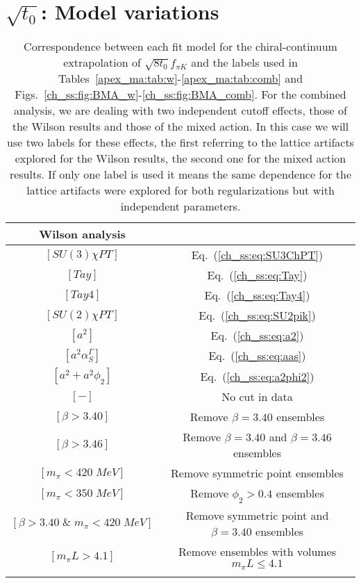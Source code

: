 
\chapter{$\sqrt{t_0}$: Model variations}
\label{apex_model_av_t0}


\begin{longtable}{c | c}
\label{apex_ma:tab:labels}
Wilson analysis \\
\toprule
$[SU(3)\chi PT]$ & Eq.~(\ref{ch_ss:eq:SU3ChPT}) \\
$[Tay]$ & Eq.~(\ref{ch_ss:eq:Tay}) \\
$[Tay4]$ & Eq.~(\ref{ch_ss:eq:Tay4}) \\
$[SU(2)\chi PT]$ & Eq.~(\ref{ch_ss:eq:SU2pik}) \\
\midrule
$[a^2]$ & Eq.~(\ref{ch_ss:eq:a2}) \\
$[a^2\alpha_S^{\Gamma}]$ & Eq.~(\ref{ch_ss:eq:aas}) \\
$[a^2+a^2\phi_2]$ & Eq.~(\ref{ch_ss:eq:a2phi2}) \\
\midrule
$[-]$ & No cut in data \\
$[\beta>3.40]$ & Remove $\beta=3.40$ ensembles \\
$[\beta>3.46]$ & Remove $\beta=3.40$ and $\beta=3.46$ ensembles \\
$[m_{\pi}<420\;MeV]$ & Remove symmetric point ensembles \\
$[m_{\pi}<350\;MeV]$ & Remove $\phi_2>0.4$ ensembles \\
$[\beta>3.40\;\&\;m_{\pi}<420\;MeV]$ & Remove symmetric point and $\beta=3.40$ ensembles \\
$[m_{\pi}L>4.1]$ & Remove ensembles with volumes $m_{\pi}L\leq4.1$ \\
\bottomrule
\caption{Correspondence between each fit model for the chiral-continuum extrapolation of $\sqrt{8t_0}f_{\pi K}$ and the labels used in Tables~\ref{apex_ma:tab:w}-\ref{apex_ma:tab:comb} and Figs.~\ref{ch_ss:fig:BMA_w}-\ref{ch_ss:fig:BMA_comb}. For the combined analysis, we are dealing with two independent cutoff effects, those of the Wilson results and those of the mixed action. In this case we will use two labels for these effects, the first referring to the lattice artifacts explored for the Wilson results, the second one for the mixed action results. If only one label is used it means the same dependence for the lattice artifacts were explored for both regularizations but with independent parameters.}
\end{longtable}

